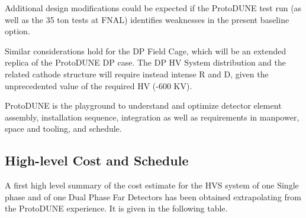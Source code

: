 Additional design modifications could be expected if the ProtoDUNE test run (as well as the 35 ton tests at FNAL) identifies weaknesses in the present baseline option.

Similar considerations hold for the DP Field Cage, which will be an extended replica of the ProtoDUNE DP case. The DP HV System distribution and the related cathode structure will require instead intense R and D, given the unprecedented value of the required HV (-600 KV). 

ProtoDUNE is the playground to understand and optimize detector element assembly, installation sequence, integration as well as requirements in manpower, space and tooling, and schedule. 



%
%
%
\subsection{High-level Cost and Schedule}
\label{sec:fdsp-hv-org-cs}

A first high level summary of the cost estimate for the HVS system of one Single phase and of one Dual Phase Far Detectors has been obtained extrapolating from the ProtoDUNE experience. It is given in the  following table.
















